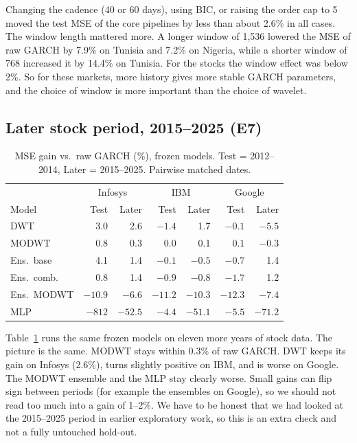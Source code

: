 \documentclass{article}
\begin{document}
Changing the cadence (40 or 60 days), using BIC, or raising the order cap to 5 moved the test MSE of the core pipelines by less than about 2.6\% in all cases. The window length mattered more. A longer window of 1,536 lowered the MSE of raw GARCH by 7.9\% on Tunisia and 7.2\% on Nigeria, while a shorter window of 768 increased it by 14.4\% on Tunisia. For the stocks the window effect was below 2\%. So for these markets, more history gives more stable GARCH parameters, and the choice of window is more important than the choice of wavelet.

\subsection{Later stock period, 2015--2025 (E7)}

\begin{table}[t]
\caption{MSE gain vs.\ raw GARCH (\%), frozen models. Test = 2012--2014, Later = 2015--2025. Pairwise matched dates.}
\label{tab:later}
\centering\small
\setlength{\tabcolsep}{3pt}
\begin{tabular}{lrrrrrr}
\toprule
 & \multicolumn{2}{c}{Infosys} & \multicolumn{2}{c}{IBM} & \multicolumn{2}{c}{Google}\\
Model & Test & Later & Test & Later & Test & Later\\
\midrule
DWT & 3.0 & 2.6 & $-1.4$ & 1.7 & $-0.1$ & $-5.5$\\
MODWT & 0.8 & 0.3 & 0.0 & 0.1 & 0.1 & $-0.3$\\
Ens.\ base & 4.1 & 1.4 & $-0.1$ & $-0.5$ & $-0.7$ & 1.4\\
Ens.\ comb. & 0.8 & 1.4 & $-0.9$ & $-0.8$ & $-1.7$ & 1.2\\
Ens.\ MODWT & $-10.9$ & $-6.6$ & $-11.2$ & $-10.3$ & $-12.3$ & $-7.4$\\
MLP & $-812$ & $-52.5$ & $-4.4$ & $-51.1$ & $-5.5$ & $-71.2$\\
\bottomrule
\end{tabular}
\end{table}

Table~\ref{tab:later} runs the same frozen models on eleven more years of stock data. The picture is the same. MODWT stays within 0.3\% of raw GARCH. DWT keeps its gain on Infosys (2.6\%), turns slightly positive on IBM, and is worse on Google. The MODWT ensemble and the MLP stay clearly worse. Small gains can flip sign between periods (for example the ensembles on Google), so we should not read too much into a gain of 1--2\%. We have to be honest that we had looked at the 2015--2025 period in earlier exploratory work, so this is an extra check and not a fully untouched hold-out.
\end{document}
